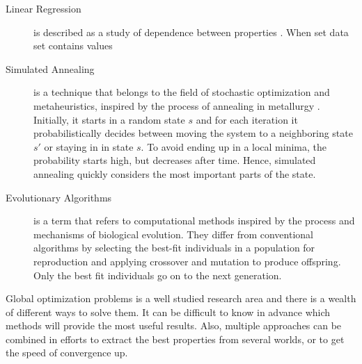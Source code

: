 \begin{description}
    \item[Linear Regression] is described as a study of dependence between
        properties \cite{weisberg2005applied}. When set data set contains
        values 
    \item[Simulated Annealing] is a technique that belongs to the field of
        stochastic optimization and metaheuristics, inspired by the process of
        annealing in metallurgy \cite{van1987simulated}. Initially, it starts in a random state $s$ and
        for each iteration it probabilistically decides between moving the
        system to a neighboring state $s'$ or staying in in state $s$. To avoid
        ending up in a local minima, the probability starts high, but decreases
        after time. Hence, simulated annealing quickly considers the most
        important parts of the state.
    \item[Evolutionary Algorithms] is a term that refers to computational
        methods inspired by the process and mechanisms of biological evolution.
        They differ from conventional algorithms by selecting the best-fit
        individuals in a population for reproduction and applying crossover and
        mutation to produce offspring. Only the best fit individuals go on to
        the next generation.
\end{description}

Global optimization problems is a well studied research area and there is a
wealth of different ways to solve them. It can be difficult to know in advance
which methods will provide the most useful results. Also, multiple approaches
can be combined in efforts to extract the best properties from several worlds,
or to get the speed of convergence up.

